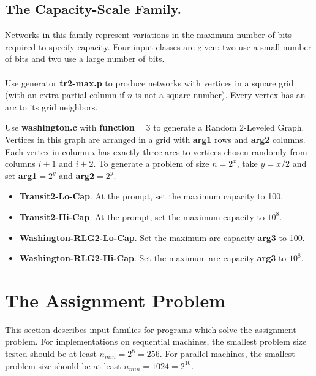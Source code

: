 \subsection{The Capacity-Scale Family.} 
 
Networks in this family represent variations in the maximum number of
bits required to specify capacity.  Four input classes are given: two
use a small number of bits and two use a large number of bits.

\paragraph{ }

Use generator {\bf tr2-max.p} to produce networks with vertices in a
square grid (with an extra partial column if $n$ is not a square
number).  Every vertex has an arc to its grid neighbors. 

Use {\bf washington.c} with {\bf function}$=3$ to generate a Random
2-Leveled Graph.  Vertices in this graph are arranged in a grid with
{\bf arg1} rows and {\bf arg2} columns.  Each vertex in column $i$ has
exactly three arcs to vertices chosen randomly from columns $i+1$ and
$i+2$.  To generate a problem of size $n=2^{x}$, take $y=x/2$ and set
{\bf arg1}$= 2^y$ and {\bf arg2}$=2^y$.

\begin{itemize} 
\item {\bf Transit2-Lo-Cap}.  At the prompt, set the maximum
capacity to 100.

\item {\bf Transit2-Hi-Cap}. At the prompt, set the maximum 
capacity to $10^8$.

\item {\bf Washington-RLG2-Lo-Cap}. Set the maximum arc 
capacity {\bf arg3} to 100.

\item {\bf Washington-RLG2-Hi-Cap}. Set the maximum arc capacity 
{\bf arg3} to $10^8$.
\end{itemize} 

\section{The Assignment Problem}

This section describes input families for programs which solve the
assignment problem.  For implementations on sequential machines, the
smallest problem size tested should be at least $n_{min} = 2^8 = 256$.
For parallel machines, the smallest problem size should be at least
$n_{min} = 1024 = 2^{10}$.

